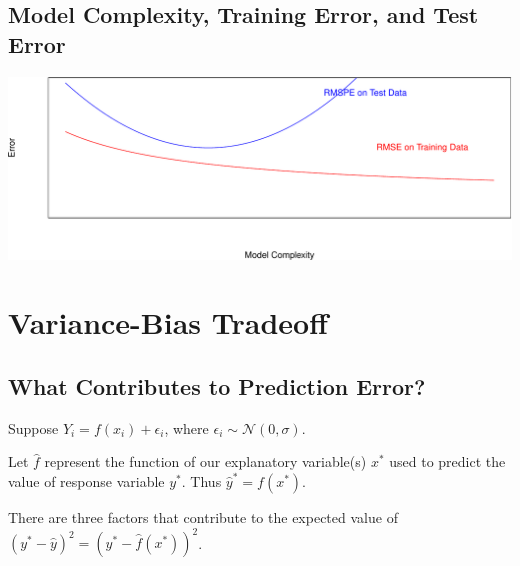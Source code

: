 \documentclass[
  letterpaper,
  DIV=11,
  numbers=noendperiod]{scrreprt}
\begin{document}
\subsection{Model Complexity, Training Error, and Test
Error}\label{model-complexity-training-error-and-test-error}

\includegraphics{Ch7_files/figure-pdf/unnamed-chunk-24-1.pdf}

\section{Variance-Bias Tradeoff}\label{variance-bias-tradeoff}

\subsection{What Contributes to Prediction
Error?}\label{what-contributes-to-prediction-error}

Suppose \(Y_i = f(x_i) + \epsilon_i\), where
\(\epsilon_i\sim\mathcal{N}(0,\sigma)\).

Let \(\hat{f}\) represent the function of our explanatory variable(s)
\(x^*\) used to predict the value of response variable \(y^*\). Thus
\(\hat{y}^* = f(x^*)\).

There are three factors that contribute to the expected value of
\(\left(y^* - \hat{y}\right)^2 = \left(y^* - \hat{f}(x^*)\right)^2\).
\end{document}
